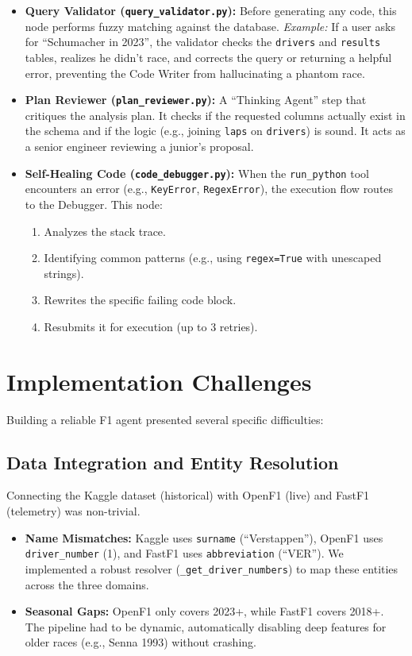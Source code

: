 \documentclass[11pt]{article}
\begin{document}
\begin{itemize}[leftmargin=1.5em]
    \item \textbf{Query Validator (\texttt{query\_validator.py}):}
    Before generating any code, this node performs fuzzy matching against the database.
    \textit{Example:} If a user asks for ``Schumacher in 2023'', the validator checks the \texttt{drivers} and \texttt{results} tables, realizes he didn't race, and corrects the query or returning a helpful error, preventing the Code Writer from hallucinating a phantom race.
    
    \item \textbf{Plan Reviewer (\texttt{plan\_reviewer.py}):}
    A ``Thinking Agent'' step that critiques the analysis plan. It checks if the requested columns actually exist in the schema and if the logic (e.g., joining \texttt{laps} on \texttt{drivers}) is sound. It acts as a senior engineer reviewing a junior's proposal.
    
    \item \textbf{Self-Healing Code (\texttt{code\_debugger.py}):}
    When the \texttt{run\_python} tool encounters an error (e.g., \texttt{KeyError}, \texttt{RegexError}), the execution flow routes to the Debugger. This node:
    \begin{enumerate}
        \item Analyzes the stack trace.
        \item Identifying common patterns (e.g., using \texttt{regex=True} with unescaped strings).
        \item Rewrites the specific failing code block.
        \item Resubmits it for execution (up to 3 retries).
    \end{enumerate}
\end{itemize}

\section{Implementation Challenges}

Building a reliable F1 agent presented several specific difficulties:

\subsection{Data Integration and Entity Resolution}
Connecting the Kaggle dataset (historical) with OpenF1 (live) and FastF1 (telemetry) was non-trivial.
\begin{itemize}
    \item \textbf{Name Mismatches:} Kaggle uses \texttt{surname} (``Verstappen''), OpenF1 uses \texttt{driver\_number} (1), and FastF1 uses \texttt{abbreviation} (``VER''). We implemented a robust resolver (\texttt{\_get\_driver\_numbers}) to map these entities across the three domains.
    \item \textbf{Seasonal Gaps:} OpenF1 only covers 2023+, while FastF1 covers 2018+. The pipeline had to be dynamic, automatically disabling deep features for older races (e.g., Senna 1993) without crashing.
\end{itemize}
\end{document}

